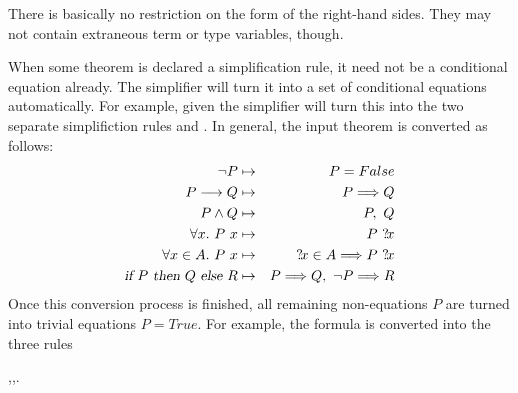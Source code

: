 \begin{isabellebody}
\begin{isamarkuptext}
There is basically no restriction on the form of the right-hand
sides.  They may not contain extraneous term or type variables, though.%
\end{isamarkuptext}%
%
%
\begin{isamarkuptext}%
When some theorem is declared a simplification rule, it need not be a
conditional equation already.  The simplifier will turn it into a set of
conditional equations automatically.  For example, given  the simplifier will turn this into the two separate
simplifiction rules  and . In
general, the input theorem is converted as follows:
\begin{eqnarray}
\neg P &\mapsto& P = False \nonumber\\
P \longrightarrow Q &\mapsto& P \Longrightarrow Q \nonumber\\
P \land Q &\mapsto& P,\ Q \nonumber\\
\forall x.~P~x &\mapsto& P~{?\!x}\nonumber\\
\forall x \in A.\ P~x &\mapsto& {?\!x} \in A \Longrightarrow P~{?\!x} \nonumber\\
\emph{\sl if}\ P\ \emph{\sl then}\ Q\ \emph{\sl else}\ R &\mapsto&
 P \Longrightarrow Q,\ \neg P \Longrightarrow R \nonumber
\end{eqnarray}
Once this conversion process is finished, all remaining non-equations
$P$ are turned into trivial equations $P = True$.
For example, the formula  is converted into the three rules
\begin{center}
,\quad  {},\quad  {}.
\end{center}
%
\end{isamarkuptext}%
\end{isabellebody}%
